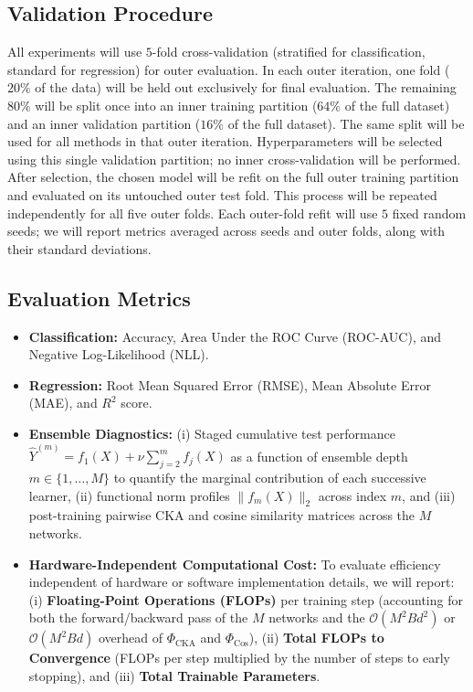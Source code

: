 \documentclass[11pt, a4paper]{article}
\begin{document}
\subsection{Validation Procedure}
All experiments will use $5$-fold cross-validation (stratified for classification, standard for regression) for outer evaluation. In each outer iteration, one fold ($20\%$ of the data) will be held out exclusively for final evaluation. The remaining $80\%$ will be split once into an inner training partition ($64\%$ of the full dataset) and an inner validation partition ($16\%$ of the full dataset). The same split will be used for all methods in that outer iteration. Hyperparameters will be selected using this single validation partition; no inner cross-validation will be performed. After selection, the chosen model will be refit on the full outer training partition and evaluated on its untouched outer test fold. This process will be repeated independently for all five outer folds. Each outer-fold refit will use $5$ fixed random seeds; we will report metrics averaged across seeds and outer folds, along with their standard deviations.

\subsection{Evaluation Metrics}
\begin{itemize}
    \item \textbf{Classification:} Accuracy, Area Under the ROC Curve (ROC-AUC), and Negative Log-Likelihood (NLL).
    \item \textbf{Regression:} Root Mean Squared Error (RMSE), Mean Absolute Error (MAE), and $R^2$ score.
    \item \textbf{Ensemble Diagnostics:} (i) Staged cumulative test performance $\hat{Y}^{(m)} = f_1(X) + \nu \sum_{j=2}^m f_j(X)$ as a function of ensemble depth $m \in \{1, \dots, M\}$ to quantify the marginal contribution of each successive learner, (ii) functional norm profiles $\|f_m(X)\|_2$ across index $m$, and (iii) post-training pairwise CKA and cosine similarity matrices across the $M$ networks.
    \item \textbf{Hardware-Independent Computational Cost:} To evaluate efficiency independent of hardware or software implementation details, we will report: (i) \textbf{Floating-Point Operations (FLOPs)} per training step (accounting for both the forward/backward pass of the $M$ networks and the $\mathcal{O}(M^2 B d^2)$ or $\mathcal{O}(M^2 B d)$ overhead of $\Phi_{\text{CKA}}$ and $\Phi_{\text{Cos}}$), (ii) \textbf{Total FLOPs to Convergence} (FLOPs per step multiplied by the number of steps to early stopping), and (iii) \textbf{Total Trainable Parameters}.
\end{itemize}
\end{document}
